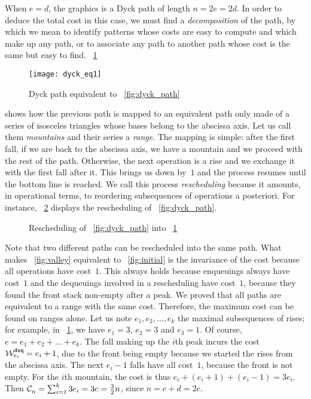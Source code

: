 When \(e=d\), the graphics is a Dyck path of length \(n=2e=2d\). In
order to deduce the total cost in this case, we must find a
\emph{decomposition} of the path, by which we mean to identify
patterns whose costs are easy to compute and which make up any path,
or to associate any path to another path whose cost is the same but
easy to find. \Fig~\ref{fig:dyck_eq1}
\begin{figure}[b]
\centering
\texttt{[image: dyck\_eq1]}
\caption{Dyck path equivalent to \fig~\ref{fig:dyck_path}
\label{fig:dyck_eq1}}
\end{figure}
shows how the previous path is mapped to an equivalent path only made
of a series of isosceles triangles whose bases belong to the abscissa
axis. Let us call them \emph{mountains} and their series a
\emph{range}. The mapping is simple: after the first fall, if we are
back to the abscissa axis, we have a mountain and we proceed with the
rest of the path. Otherwise, the next operation is a rise and we
exchange it with the first fall after it. This brings us down by~\(1\)
and the process resumes until the bottom line is reached. We call this
process \emph{rescheduling} because it amounts, in operational terms,
to reordering subsequences of operations a posteriori. For instance,
\fig~\ref{fig:rescheduling} displays the rescheduling of
\fig~\ref{fig:dyck_path}.
\begin{figure}
\centering
{}
\qquad
{}
\qquad
{}
\qquad
{}
\caption{Rescheduling of \fig~\ref{fig:dyck_path} into
  \fig~\ref{fig:dyck_eq1}\label{fig:rescheduling}}
\end{figure}
Note that two different paths can be rescheduled into the same
path. What makes \fig~\ref{fig:valley} equivalent to
\fig~\ref{fig:initial} is the invariance of the cost because all
operations have cost~\(1\). This always holds because enqueuings
always have cost~\(1\) and the dequeuings involved in a rescheduling
have cost~\(1\), because they found the front stack non\hyp{}empty
after a peak. We proved that all paths are equivalent to a range with
the same cost. Therefore, the maximum cost can be found on ranges
alone. Let us note \(e_1, e_2, \dots, e_k\) the maximal subsequences
of rises; for example, in \fig~\ref{fig:dyck_eq1}, we have \(e_1=3\),
\(e_2 = 3\) and \(e_3 = 1\). Of course, \(e = e_1 + e_2 + \dots +
e_k\). The fall making up the \(i\)th peak incurs the cost
\(\W{\texttt{deq}}{e_i} = e_i + 1\), due to the front being empty
because we started the rises from the abscissa axis. The next
\(e_i-1\) falls have all cost~\(1\), because the front is not
empty. For the \(i\)th mountain, the cost is thus
\(e_i+(e_i+1)+(e_i-1) = 3e_i\). Then \(\C{}{n} = \sum_{i=1}^{k}{3e_i}
= 3e = \frac{3}{2}n\), since \(n=e+d=2e\).

